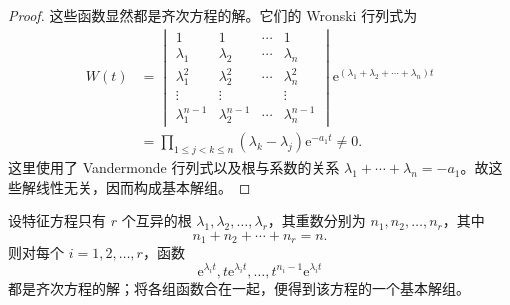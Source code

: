 \begin{proof}
	这些函数显然都是齐次方程的解。它们的 Wronski 行列式为
	\[
		\begin{aligned}
		W(t)
		&=
		\begin{vmatrix}
			1&1&\cdots&1\\
			\lambda_1&\lambda_2&\cdots&\lambda_n\\
			\lambda_1^2&\lambda_2^2&\cdots&\lambda_n^2\\
			\vdots&\vdots&&\vdots\\
			\lambda_1^{n-1}&\lambda_2^{n-1}&\cdots&\lambda_n^{n-1}
		\end{vmatrix}
		\mathrm{e}^{(\lambda_1+\lambda_2+\cdots+\lambda_n)t}\\
		&=\prod_{1\leq j<k\leq n}(\lambda_k-\lambda_j)\mathrm{e}^{-a_1t}\neq0.
		\end{aligned}
	\]
	这里使用了 Vandermonde 行列式以及根与系数的关系
	$\lambda_1+\cdots+\lambda_n=-a_1$。故这些解线性无关，因而构成基本解组。
\end{proof}

\begin{theorem}\label{thm:重特征根的基本解组}
	设特征方程只有 $r$ 个互异的根
	$\lambda_1,\lambda_2,\ldots,\lambda_r$，其重数分别为
	$n_1,n_2,\ldots,n_r$，其中
	\[
		n_1+n_2+\cdots+n_r=n.
	\]
	则对每个 $i=1,2,\ldots,r$，函数
	\[
		\mathrm{e}^{\lambda_it},
		t\mathrm{e}^{\lambda_it},
		\ldots,
		t^{n_i-1}\mathrm{e}^{\lambda_it}
	\]
	都是齐次方程的解；将各组函数合在一起，便得到该方程的一个基本解组。
\end{theorem}

